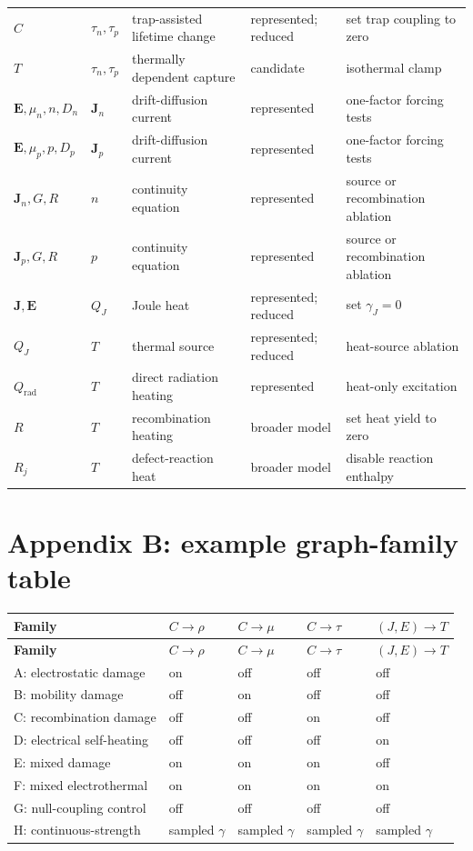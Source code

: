 \documentclass[11pt]{article}
\newcommand{\Evec}{\bm{E}}
\newcommand{\Jvec}{\bm{J}}
\begin{document}
\begin{longtable}{p{}p{}p{}p{}p{}}
\(C\) & \(\tau_n,\tau_p\) & trap-assisted lifetime change & represented; reduced & set trap coupling to zero \\
\(T\) & \(\tau_n,\tau_p\) & thermally dependent capture & candidate & isothermal clamp \\
\(\Evec,\mu_n,n,D_n\) & \(\Jvec_n\) & drift-diffusion current & represented & one-factor forcing tests \\
\(\Evec,\mu_p,p,D_p\) & \(\Jvec_p\) & drift-diffusion current & represented & one-factor forcing tests \\
\(\Jvec_n,G,R\) & \(n\) & continuity equation & represented & source or recombination ablation \\
\(\Jvec_p,G,R\) & \(p\) & continuity equation & represented & source or recombination ablation \\
\(\Jvec,\Evec\) & \(Q_J\) & Joule heat & represented; reduced & set \(\gamma_J=0\) \\
\(Q_J\) & \(T\) & thermal source & represented; reduced & heat-source ablation \\
\(Q_{\mathrm{rad}}\) & \(T\) & direct radiation heating & represented & heat-only excitation \\
\(R\) & \(T\) & recombination heating & broader model & set heat yield to zero \\
\(R_j\) & \(T\) & defect-reaction heat & broader model & disable reaction enthalpy \\
\bottomrule
\end{longtable}
\normalsize

\section{Appendix B: example graph-family table}

\small
\begin{longtable}{p{}p{}p{}p{}p{}}
\toprule
\textbf{Family} & \(C\to\rho\) & \(C\to\mu\) & \(C\to\tau\) & \((J,E)\to T\) \\
\midrule
\endfirsthead
\toprule
\textbf{Family} & \(C\to\rho\) & \(C\to\mu\) & \(C\to\tau\) & \((J,E)\to T\) \\
\midrule
\endhead
A: electrostatic damage & on & off & off & off \\
B: mobility damage & off & on & off & off \\
C: recombination damage & off & off & on & off \\
D: electrical self-heating & off & off & off & on \\
E: mixed damage & on & on & on & off \\
F: mixed electrothermal & on & on & on & on \\
G: null-coupling control & off & off & off & off \\
H: continuous-strength & sampled \(\gamma\) & sampled \(\gamma\) & sampled \(\gamma\) & sampled \(\gamma\) \\
\bottomrule
\end{longtable}
\normalsize
\end{document}
